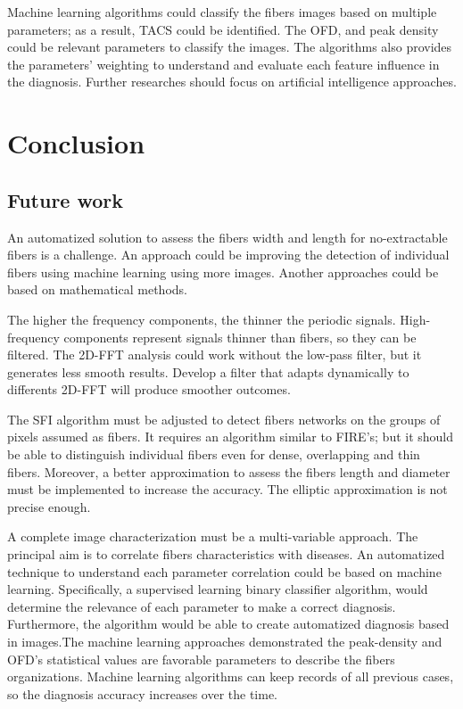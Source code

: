 \documentclass[12pt,a4paper]{article}
\begin{document}
Machine learning algorithms could classify the fibers images based on multiple parameters; as a result, TACS could be identified. The OFD, and peak density could be relevant parameters to classify the images. The algorithms also provides the parameters' weighting to understand and evaluate each feature influence in the diagnosis. Further researches should focus on artificial intelligence approaches. 

\section{Conclusion}
\subsection{Future work}
An automatized solution to assess the fibers width and length for no-extractable fibers is a challenge. An approach could be improving the detection of individual fibers using machine learning using more images. Another approaches could be based on mathematical methods. 

The higher the frequency components, the thinner the periodic signals. High-frequency components represent signals thinner than fibers, so they can be filtered. The 2D-FFT analysis could work without the low-pass filter, but it generates less smooth results. Develop a filter that adapts dynamically to differents 2D-FFT will produce smoother outcomes.

The SFI algorithm must be adjusted to detect fibers networks on the groups of pixels assumed as fibers. It requires an algorithm similar to FIRE's; but it should be able to distinguish individual fibers even for dense, overlapping and thin fibers. Moreover, a better approximation to assess the fibers length and diameter must be implemented to increase the accuracy. The elliptic approximation is not precise enough.

A complete image characterization must be a multi-variable approach. The principal aim is to correlate fibers characteristics with diseases. An automatized technique to understand each parameter correlation could be based on machine learning. Specifically, a supervised learning binary classifier algorithm, would determine the relevance of each parameter to make a correct diagnosis. Furthermore, the algorithm would be able to create automatized diagnosis based in images.The machine learning approaches demonstrated the peak-density and OFD's statistical values are favorable parameters to describe the fibers organizations. Machine learning algorithms can keep records of all  previous cases, so the diagnosis accuracy increases over the time. 
\end{document}
